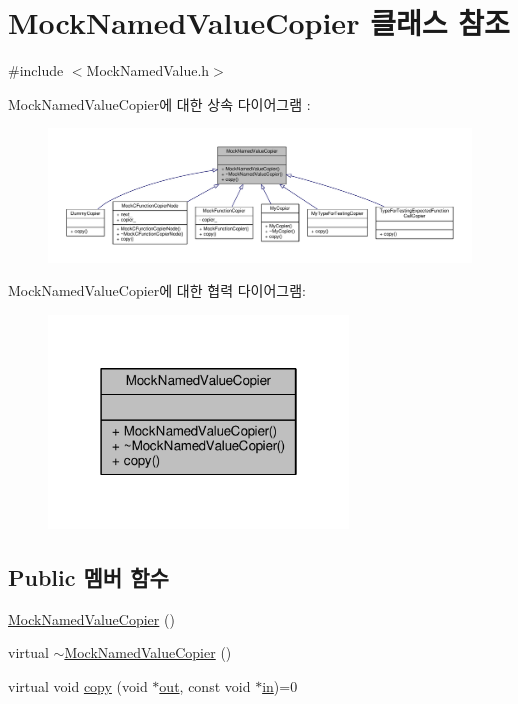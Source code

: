 \hypertarget{class_mock_named_value_copier}{}\section{Mock\+Named\+Value\+Copier 클래스 참조}
\label{class_mock_named_value_copier}


{\ttfamily \#include $<$Mock\+Named\+Value.\+h$>$}



Mock\+Named\+Value\+Copier에 대한 상속 다이어그램 \+: 
\nopagebreak
\begin{figure}[H]
\begin{center}
\leavevmode
\includegraphics[width=350pt]{class_mock_named_value_copier__inherit__graph}
\end{center}
\end{figure}


Mock\+Named\+Value\+Copier에 대한 협력 다이어그램\+:
\nopagebreak
\begin{figure}[H]
\begin{center}
\leavevmode
\includegraphics[width=226pt]{class_mock_named_value_copier__coll__graph}
\end{center}
\end{figure}
\subsection*{Public 멤버 함수}
\begin{DoxyCompactItemize}
\item 
\hyperlink{class_mock_named_value_copier_ac4efad6f49b420404620eb32d55b304c}{Mock\+Named\+Value\+Copier} ()
\item 
virtual \hyperlink{class_mock_named_value_copier_a88a3d0c254ae0e31bdd9d7433a9590b8}{$\sim$\+Mock\+Named\+Value\+Copier} ()
\item 
virtual void \hyperlink{class_mock_named_value_copier_aa02ce3bdc5575d21faa2c0ea37e1b160}{copy} (void $\ast$\hyperlink{jack__listener_8c_a1cdcf0ac9be9edf74b8fcedb01e26cf3}{out}, const void $\ast$\hyperlink{jack_8c_afc03a33132f7c0bcacbeeeaf5b8510c0}{in})=0
\end{DoxyCompactItemize}


